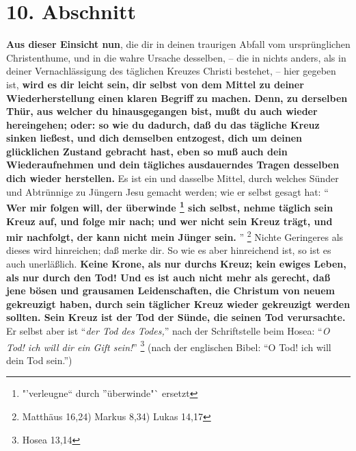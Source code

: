 \section{10. Abschnitt}

\textbf{Aus dieser Einsicht nun}, die dir in deinen traurigen Abfall vom ursprünglichen
Christenthume, und in die wahre Ursache desselben, -- die in nichts anders, als
in deiner Vernachlässigung des täglichen Kreuzes Christi bestehet, -- hier
gegeben ist, \textbf{wird es dir leicht sein, dir selbst von dem Mittel zu deiner
Wiederherstellung einen klaren Begriff zu machen. Denn, zu derselben Thür, aus
welcher du hinausgegangen bist, mußt du auch wieder hereingehen; oder: so wie du
dadurch, daß du das tägliche Kreuz sinken ließest, und dich demselben entzogest,
dich um deinen glücklichen Zustand gebracht hast, eben so muß auch dein
Wiederaufnehmen und dein tägliches ausdauerndes Tragen desselben dich wieder
herstellen.} Es ist ein und dasselbe Mittel, durch welches Sünder und Abtrünnige
zu Jüngern Jesu gemacht werden; wie er selbst gesagt hat: "` \textbf{Wer mir
folgen will, der überwinde \footnote{"'verleugne"` durch "'überwinde"` ersetzt}
sich selbst, nehme täglich sein Kreuz auf, und folge
mir nach; und wer nicht sein Kreuz trägt, und mir nachfolgt, der kann nicht mein
Jünger sein.} "' \footnote{Matthäus 16,24) Markus 8,34) Lukas 14,17}
 
 Nichte
Geringeres als dieses wird hinreichen; daß merke dir. So wie es aber hinreichend
ist, so ist es auch unerläßlich. \textbf{Keine Krone, als nur durchs Kreuz;
kein ewiges Leben, als nur durch den Tod!
Und es ist auch nicht mehr als gerecht, daß jene
bösen und grausamen Leidenschaften, die Christum von neuem gekreuzigt haben,
durch sein täglicher Kreuz wieder gekreuzigt werden sollten. Sein Kreuz ist der
Tod der Sünde, die seinen Tod verursachte.} Er selbst aber ist
"`\textit{der Tod des Todes,}"' nach der Schriftstelle beim Hosea:
"`\textit{O Tod! ich will dir ein Gift sein!}"' \footnote{Hosea 13,14}
 (nach der englischen Bibel: "`O Tod! ich will dein
Tod sein."')

